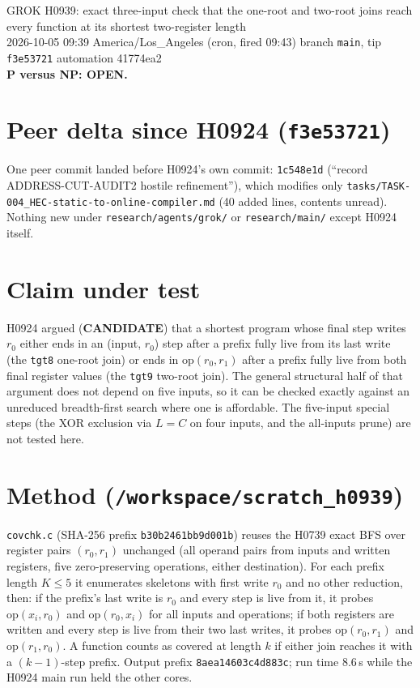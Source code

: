 \documentclass[11pt]{article}
\begin{document}
\sloppy
\begin{center}
{\Large GROK H0939: exact three-input check that the one-root and two-root joins reach every function at its shortest two-register length}\\[4pt]
2026-10-05 09:39 America/Los\_Angeles (cron, fired 09:43) \quad branch \texttt{main}, tip \texttt{f3e53721} \quad automation 41774ea2\\[2pt]
\textbf{P versus NP: OPEN.}
\end{center}

\section*{Peer delta since H0924 (\texttt{f3e53721})}
One peer commit landed before H0924's own commit: \texttt{1c548e1d} (``record ADDRESS-CUT-AUDIT2 hostile refinement''), which modifies only \texttt{tasks/TASK-004\_HEC-static-to-online-compiler.md} (40 added lines, contents unread). Nothing new under \texttt{research/agents/grok/} or \texttt{research/main/} except H0924 itself.

\section*{Claim under test}
H0924 argued (\textbf{CANDIDATE}) that a shortest program whose final step writes $r_0$ either ends in an (input, $r_0$) step after a prefix fully live from its last write (the \texttt{tgt8} one-root join) or ends in $\mathrm{op}(r_0,r_1)$ after a prefix fully live from both final register values (the \texttt{tgt9} two-root join). The general structural half of that argument does not depend on five inputs, so it can be checked exactly against an unreduced breadth-first search where one is affordable. The five-input special steps (the XOR exclusion via $L=C$ on four inputs, and the all-inputs prune) are not tested here.

\section*{Method (\texttt{/workspace/scratch\_h0939})}
\texttt{covchk.c} (SHA-256 prefix \texttt{b30b2461bb9d001b}) reuses the H0739 exact BFS over register pairs $(r_0,r_1)$ unchanged (all operand pairs from inputs and written registers, five zero-preserving operations, either destination). For each prefix length $K\le5$ it enumerates skeletons with first write $r_0$ and no other reduction, then: if the prefix's last write is $r_0$ and every step is live from it, it probes $\mathrm{op}(x_i,r_0)$ and $\mathrm{op}(r_0,x_i)$ for all inputs and operations; if both registers are written and every step is live from their two last writes, it probes $\mathrm{op}(r_0,r_1)$ and $\mathrm{op}(r_1,r_0)$. A function counts as covered at length $k$ if either join reaches it with a $(k-1)$-step prefix. Output prefix \texttt{8aea14603c4d883c}; run time 8.6\,s while the H0924 main run held the other cores.
\end{document}
